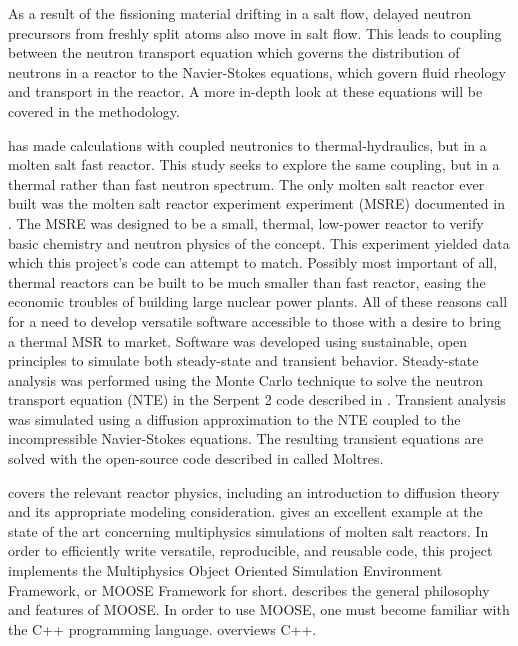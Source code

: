 \documentclass[12pt]{article}
\begin{document}
	As a result of the fissioning material drifting in a salt flow, delayed neutron precursors from freshly split atoms also move in salt flow. This leads to coupling between the neutron transport equation which governs the distribution of neutrons in a reactor to the Navier-Stokes equations, which govern fluid rheology and transport in the reactor. A more in-depth look at these equations will be covered in the methodology.

\cite{aufiero_calculating_2014} has made calculations with coupled neutronics to thermal-hydraulics, but in a molten
salt fast reactor. This study seeks to explore the same coupling, but in a thermal rather than fast
neutron spectrum. The only molten salt reactor ever built was the molten salt reactor experiment experiment (MSRE) documented in \cite{robertson_msre}. The MSRE was designed to be a small, thermal, low-power reactor to verify basic chemistry and neutron physics of the concept. This experiment yielded data which this project’s code can attempt to match. Possibly most important of all, thermal reactors can be built to be much smaller than fast reactor, easing the economic troubles of building large nuclear power plants. All of these reasons call for a need to develop versatile software accessible to those with a desire to bring a thermal MSR to market.
	Software was developed using sustainable, open principles to simulate both steady-state and transient behavior. Steady-state analysis was  performed using the Monte Carlo technique to solve the neutron transport equation (NTE) in the Serpent 2 code described in \cite{serp}. Transient analysis was simulated using a diffusion approximation to the NTE coupled to the incompressible Navier-Stokes equations. The resulting transient equations are solved with the open-source code described in \cite{moltres} called Moltres.

	\cite{duderstadt_nuclear_1976} covers the relevant reactor physics, including an introduction to diffusion theory and its appropriate modeling consideration. \cite{gaston_moose:_2009} gives an excellent example at the state of the art concerning multiphysics simulations of molten salt reactors. In order to efficiently write versatile, reproducible, and reusable code, this project implements the Multiphysics Object Oriented Simulation Environment Framework, or MOOSE Framework for short. \cite{aufiero_calculating_2014} describes the general philosophy and features of MOOSE. In order to use MOOSE, one must become familiar with the C++ programming language. \cite{schildt_c++:_2003} overviews C++.
    
\end{document}
